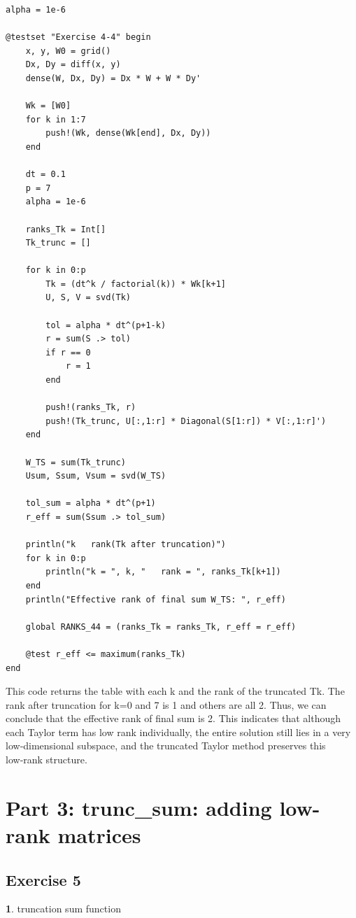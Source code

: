 \documentclass[11pt]{article}
\begin{document}
\begin{lstlisting}
alpha = 1e-6

@testset "Exercise 4-4" begin
    x, y, W0 = grid()
    Dx, Dy = diff(x, y)
    dense(W, Dx, Dy) = Dx * W + W * Dy'

    Wk = [W0]
    for k in 1:7
        push!(Wk, dense(Wk[end], Dx, Dy))
    end

    dt = 0.1
    p = 7
    alpha = 1e-6

    ranks_Tk = Int[]
    Tk_trunc = []

    for k in 0:p
        Tk = (dt^k / factorial(k)) * Wk[k+1]
        U, S, V = svd(Tk)

        tol = alpha * dt^(p+1-k)
        r = sum(S .> tol)
        if r == 0
            r = 1
        end

        push!(ranks_Tk, r)
        push!(Tk_trunc, U[:,1:r] * Diagonal(S[1:r]) * V[:,1:r]')
    end

    W_TS = sum(Tk_trunc)
    Usum, Ssum, Vsum = svd(W_TS)

    tol_sum = alpha * dt^(p+1)
    r_eff = sum(Ssum .> tol_sum)

    println("k   rank(Tk after truncation)")
    for k in 0:p
        println("k = ", k, "   rank = ", ranks_Tk[k+1])
    end
    println("Effective rank of final sum W_TS: ", r_eff)

    global RANKS_44 = (ranks_Tk = ranks_Tk, r_eff = r_eff)

    @test r_eff <= maximum(ranks_Tk)
end

\end{lstlisting}

This code returns the table with each k and the rank of the truncated Tk. The rank after truncation for k=0 and 7 is 1 and others are all 2. Thus, we can conclude that the effective rank of final sum is 2. This indicates that although each Taylor term has low rank individually, the entire solution still lies in a very low‑dimensional subspace, and the truncated Taylor method preserves this low‑rank structure.

\section*{Part 3: trunc\_sum: adding low-rank matrices}
\subsection*{Exercise 5}
\textbf{1}. truncation sum function
\end{document}
